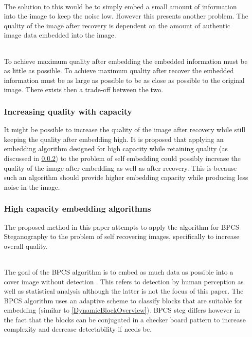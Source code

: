 \documentclass[11pt]{article}
\begin{document}
\hspace{0pt} \\
The solution to this would be to simply embed a small amount of information into the image to keep the noise low.
However this presents another problem.
The quality of the image after recovery is dependent on the amount of authentic image data embedded into the image.

\hspace{0pt} \\
To achieve maximum quality after embedding the embedded information must be as little as possible.
To achieve maximum quality after recover the embedded information must be as large as possible to be as close as possible to the original image.
There exists then a trade-off between the two.

\subsubsection{Increasing quality with capacity}
\label{introQualityIncrease}
It might be possible to increase the quality of the image after recovery while still keeping the quality after embedding high.
It is proposed that applying an embedding algorithm designed for high capacity while retaining quality (as discussed in \ref{introHighCap}) to the problem of self embedding could possibly increase the quality of the image after embedding as well as after recovery.
This is because such an algorithm should provide higher embedding capacity while producing less noise in the image. 
 

\subsubsection{High capacity embedding algorithms}
\label{introHighCap}
The proposed method in this paper attempts to apply the algorithm for BPCS Steganography \cite{beaullieubpcs} to the problem of self recovering images, specifically to increase overall quality.

\hspace{0pt} \\
The goal of the BPCS algorithm is to embed as much data as possible into a cover image without detection \cite{beaullieubpcs}.
This refers to detection by human perception as well as statistical analysis although the latter is not the focus of this paper.
The BPCS algorithm uses an adaptive scheme to classify blocks that are suitable for embedding (similar to \ref{DynamicBlockOverview}).
BPCS steg differs however in the fact that the blocks can be conjugated in a checker board pattern to increase complexity and decrease detectability if needs be.
\end{document}
